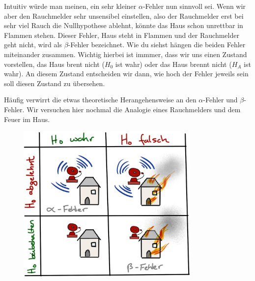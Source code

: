 \documentclass[
  letterpaper,
]{scrbook}
\begin{document}
Intuitiv würde man meinen, ein sehr kleiner \(\alpha\)-Fehler nun
sinnvoll sei. Wenn wir aber den Rauchmelder sehr unsensibel einstellen,
also der Rauchmelder erst bei sehr viel Rauch die Nullhypothese ablehnt,
könnte das Haus schon unrettbar in Flammen stehen. Dieser Fehler, Haus
steht in Flammen und der Rauchmelder geht nicht, wird als
\(\beta\)-Fehler bezeichnet. Wie du siehst hängen die beiden Fehler
miteinander zusammen. Wichtig hierbei ist immmer, dass wir uns einen
Zustand vorstellen, das Haus brent nicht (\(H_0\) ist wahr) oder das
Haus brennt nicht (\(H_A\) ist wahr). An diesem Zustand entscheiden wir
dann, wie hoch der Fehler jeweils sein soll diesen Zustand zu übersehen.

\begin{tcolorbox}[enhanced jigsaw, coltitle=black, titlerule=0mm, bottomrule=.15mm, opacityback=0, opacitybacktitle=0.6, leftrule=.75mm, title=\textcolor{quarto-callout-note-color}{\faInfo}\hspace{0.5em}{Der \(\alpha\)-Fehler und \(\beta\)-Fehler als Rauchmelderanalogie}, toprule=.15mm, bottomtitle=1mm, toptitle=1mm, left=2mm, breakable, arc=.35mm, colback=white, rightrule=.15mm, colbacktitle=quarto-callout-note-color!10!white, colframe=quarto-callout-note-color-frame]

Häufig verwirrt die etwas theoretische Herangehensweise an den
\(\alpha\)-Fehler und \(\beta\)-Fehler. Wir versuchen hier nochmal die
Analogie eines Rauchmelders und dem Feuer im Haus.

\begin{figure}

{\centering \includegraphics[width=0.8\textwidth,height=\textheight]{./images/t-verteilung_05.png}

}
\end{figure}
\end{tcolorbox}
\end{document}
